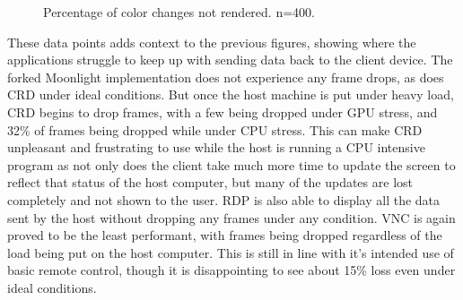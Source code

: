 \begin{figure}[t]
  \centering
  \caption[Color Delay Loss Data]{Percentage of color changes not rendered. n=400.}
  \label{fig:ColorDelayLoss}
\end{figure}

These data points adds context to the previous figures, showing where the applications struggle to keep up with sending data back to the client device.
The forked Moonlight implementation does not experience any frame drops, as does CRD under ideal conditions.
But once the host machine is put under heavy load, CRD begins to drop frames, with a few being dropped under GPU stress, and 32\% of frames being dropped while under CPU stress.
This can make CRD unpleasant and frustrating to use while the host is running a CPU intensive program as not only does the client take much more time to update the screen to reflect that status of the host computer, but many of the updates are lost completely and not shown to the user.
RDP is also able to display all the data sent by the host without dropping any frames under any condition.
VNC is again proved to be the least performant, with frames being dropped regardless of the load being put on the host computer.
This is still in line with it's intended use of basic remote control, though it is disappointing to see about 15\% loss even under ideal conditions.


